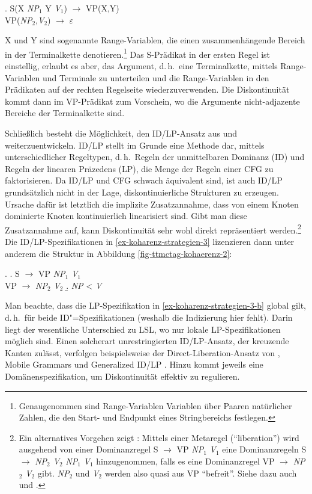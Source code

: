 \ex. \label{ex-koharenz-strategien-2}
S(X {\it NP$_1$} Y {\it V$_1$}) $\to$ VP(X,Y) \\
VP({\it NP$_2$},{\it V$_2$}) $\to$ $\varepsilon$
 
X und Y sind sogenannte Range-Variablen, die einen zusammenhängende Bereich in der Terminalkette denotieren.\footnote{Genaugenommen sind Range-Variablen Variablen über Paaren natürlicher Zahlen, die den Start- und Endpunkt eines Stringbereichs festlegen.} Das S-Prädikat in der ersten Regel ist einstellig, erlaubt es aber, das Argument, d.\,h.\ eine Terminalkette, mittels Range-Variablen und Terminale zu unterteilen und die Range-Variablen in den Prädikaten auf der rechten Regelseite wiederzuverwenden. Die Diskontinuität kommt dann im VP-Prädikat zum Vorschein, wo die Argumente nicht-adjazente Bereiche der Terminalkette sind.

\largerpage
Schlie\ss lich besteht die Möglichkeit, den ID/LP-Ansatz aus \cite{Gazdar:Pullum:81} und \cite{Shieber:84} weiterzuentwickeln. ID/LP stellt im Grunde eine Methode dar, mittels unterschiedlicher Regeltypen, d.\,h.\ Regeln der unmittelbaren Dominanz (ID) und Regeln der linearen Präzedens (LP), die Menge der Regeln einer CFG zu faktorisieren. Da ID/LP und CFG schwach äquivalent sind, ist auch ID/LP grundsätzlich nicht in der Lage, diskontinuierliche Strukturen zu erzeugen. Ursache dafür ist letztlich die implizite Zusatzannahme, dass von einem Knoten dominierte Knoten kontinuierlich linearisiert sind. Gibt man diese Zusatzannahme auf, kann Diskontinuität sehr wohl direkt repräsentiert werden.\footnote{Ein alternatives Vorgehen zeigt \cite{Pullum:82}: Mittels einer Metaregel ("`liberation"') wird ausgehend von einer Dominanzregel S $\to$ VP {\it NP$_1$} {\it V$_1$} eine Dominanzregeln S $\to$ {\it NP$_2$} {\it V$_2$} {\it NP$_1$} {\it V$_1$} hinzugenommen, falls es eine Dominanzregel VP $\to$ {\it NP$_2$} {\it V$_2$} gibt. {\it NP$_2$} und {\it V$_2$} werden also quasi aus VP "`befreit"'. Siehe dazu auch \citet[81f]{Kathol:95} und \citet[32f]{Kathol:00}.} Die ID/LP-Spezifikationen in \ref{ex-koharenz-strategien-3} lizenzieren dann unter anderem die Struktur in Abbildung \ref{fig-ttmctag-kohaerenz-2}: 

\ex. \label{ex-koharenz-strategien-3} 
\a. S $\to$ VP {\it NP$_1$} {\it V$_1$} \\
VP $\to$ {\it NP$_2$} {\it V$_2$}
\b. \label{ex-koharenz-strategien-3-b} {\it NP} < {\it V}

Man beachte, dass die LP-Spezifikation in \ref{ex-koharenz-strategien-3-b} global gilt, d.\,h.\ für beide ID"=Spezifikationen (weshalb die Indizierung hier fehlt). Darin liegt der wesentliche Unterschied zu LSL, wo nur lokale LP-Spezifikationen möglich sind. Einen solcherart unrestringierten ID/LP-Ansatz, der kreuzende Kanten zulässt, verfolgen  beispielsweise der Direct-Liberation-Ansatz von \cite{Zwicky:86}, Mobile Grammars \citep{Blevins:90} und Generalized ID/LP \citep{Daniels:05}. Hinzu kommt jeweils eine Domänenspezifikation, um Diskontinuität effektiv zu regulieren.

